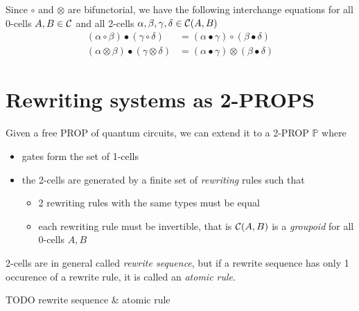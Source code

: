 \documentclass[a4paper]{article}
\begin{document}
\begin{remark}
Since $\circ$ and $\otimes$ are bifunctorial, we have the following
interchange equations for all 0-cells $A, B \in {\cal C}$ and all 2-cells $\alpha,
  \beta, \gamma, \delta \in {\cal C}(A, B)$
\begin{align}
(\alpha \circ \beta) \bullet (\gamma \circ \delta) &= (\alpha \bullet \gamma)
  \circ (\beta \bullet \delta) \\
(\alpha \otimes \beta) \bullet (\gamma \otimes \delta) &= (\alpha \bullet
  \gamma) \otimes (\beta \bullet \delta)
\end{align}
\end{remark}

\section{Rewriting systems as 2-PROPS}
\label{sec:rewriting}

\begin{definition}
Given a free PROP of quantum circuits, we can extend it to a 2-PROP $\mathbb{P}$
  where
\begin{itemize}
\item gates form the set of 1-cells 
\item the 2-cells are generated by a finite set of \emph{rewriting} rules such
  that
\begin{itemize}
\item 2 rewriting rules with the same types must be equal
\item each rewriting rule must be invertible, that is ${\cal C}(A, B)$ is a
  \emph{groupoid} for all 0-cells $A, B$
\end{itemize}
\end{itemize}

2-cells are in general called \emph{rewrite sequence}, but if a rewrite sequence
  has only 1 occurence of a rewrite rule, it is called an \emph{atomic rule}.
\end{definition}

\begin{example}
TODO rewrite sequence \& atomic rule
\end{example}
\end{document}
